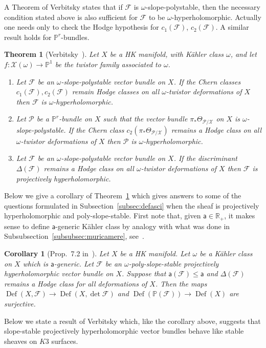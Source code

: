 \documentclass[11pt]{amsart}
\newcommand{\PP}{{\mathbb P}}
\newcommand{\RR}{{\mathbb R}}
\let\mathcal\mathscr
\def\cF{\mathcal{F}}
\def\cP{\mathcal{P}}
\def\cX{\mathcal{X}}
\DeclareMathOperator{\Def}{Def}
\newtheorem{thm}[lmm]{Theorem}
\newtheorem{crl}[lmm]{Corollary}
\theoremstyle{definition}
\theoremstyle{remark}
\begin{document}
%
A Theorem of Verbitsky states that if $\cF$ is  $\omega$-slope-polystable, then the necessary condition stated above is also sufficient for $\cF$ to be $\omega$-hyperholomorphic. Actually one needs only to check the Hodge hypothesis for $c_1(\cF)$, $c_2(\cF)$. A similar result holds for 
$\PP^r$-bundles. 
%
\begin{thm}[Verbitsky~\cite{verb:iperolom}]\label{thm:iperolom}
%
Let $X$ be a HK manifold, with K\"ahler class $\omega$, and let $f\colon \cX(\omega)\to\PP^1$ be the twistor family associated to $\omega$. 
%
\begin{enumerate}
%
\item
%
Let $\cF$ be an $\omega$-slope-polystable vector bundle  on $X$. If the Chern classes $c_1(\cF),c_2(\cF)$ remain  Hodge classes on 
all $\omega$-twistor deformations of $X$ then $\cF$ is $\omega$-hyperholomorphic.
%
\item
%
Let $\cP$ be a $\PP^r$-bundle  on $X$ such that  the vector bundle $\pi_{*}\Theta_{\cP/\cX}$ on $X$ is $\omega$-slope-polystable. If the Chern class $c_2(\pi_{*}\Theta_{\cP/\cX})$ remains a  Hodge class on all $\omega$-twistor deformations of $X$ then $\cP$ is $\omega$-hyperholomorphic.
%
\item
%
Let $\cF$ be an $\omega$-slope-polystable  vector bundle  on $X$.  If the discriminant $\Delta(\cF)$ remains a  Hodge class on 
all $\omega$-twistor deformations of $X$ then $\cF$ is
 projectively hyperholomorphic.
%
\end{enumerate}
%
%
\end{thm}
%
Below we give a corollary of Theorem~\ref{thm:iperolom} which gives answers to some of the questions formulated in Subsection~\ref{subsec:defasci} when the sheaf is projectively hyperholomorphic and poly-slope-stable. 
First  note that, given ${\mathsf a}\in\RR_{+}$, it makes sense to define ${\mathsf a}$-generic K\"ahler class by analogy with what was done in Subsubsection~\ref{subsubsec:muricamere}, see~\cite[Def.~5.3]{og:highdim}. 
%
\begin{crl}[Prop.~7.2 in~\cite{og:highdim}]
%
Let $X$ be a HK manifold. Let $\omega$ be a K\"ahler class on $X$ which is ${\mathsf a}$-generic. 
Let $\cF$ be an $\omega$-poly-slope-stable projectively hyperholomorphic vector bundle  on $X$.  Suppose that ${\mathsf a}(\cF)\le {\mathsf a}$ and $\Delta(\cF)$ remains a  Hodge class for all deformations of $X$. Then the maps $\Def(X,\cF) \to \Def(X,\det\cF)$ and $\Def(\PP(\cF)) \to \Def(X)$ are surjective.
%
\end{crl}
%
Below we state a result of Verbitsky which, like the corollary above, suggests that slope-stable projectively hyperholomorphic vector bundles behave like stable sheaves on $K3$ surfaces.
\end{document}

